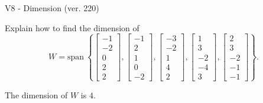 \begin{exercise}
  \begin{exerciseTitle}V8 - Dimension (ver. 220)\end{exerciseTitle}
  \begin{exerciseStatement}
    Explain how to find the dimension of 
\[W=\mathrm{span}\ \left\{\left[\begin{array}{r}
-1 \\
-2 \\
0 \\
2 \\
2
\end{array}\right] , \left[\begin{array}{r}
-1 \\
2 \\
1 \\
0 \\
-2
\end{array}\right] , \left[\begin{array}{r}
-3 \\
-2 \\
1 \\
4 \\
2
\end{array}\right] , \left[\begin{array}{r}
1 \\
3 \\
-2 \\
-4 \\
3
\end{array}\right] , \left[\begin{array}{r}
2 \\
3 \\
-2 \\
-1 \\
-1
\end{array}\right]\right\}.\]



  \end{exerciseStatement}
  \begin{exerciseAnswer}
   The dimension of \(W\) is  \(4\).
  


  \end{exerciseAnswer}
\end{exercise}